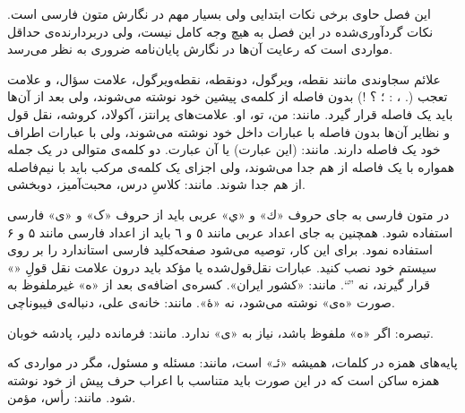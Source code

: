


این فصل حاوی برخی نکات ابتدایی ولی بسیار مهم در نگارش متون فارسی است. 
نکات گردآوری‌شده در این فصل به‌ هیچ‌ وجه کامل نیست، 
ولی دربردارنده‌ی حداقل مواردی است که رعایت آن‌ها در نگارش پایان‌نامه ضروری به نظر می‌رسد.



علائم سجاوندی مانند نقطه، ویرگول، دونقطه، نقطه‌ویرگول، علامت سؤال، و علامت تعجب (. ، : ؛ ؟ !) بدون فاصله از کلمه‌ی پیشین خود نوشته می‌شوند، ولی بعد از آن‌ها باید یک فاصله‌ قرار گیرد. مانند: من، تو، او.
علامت‌های پرانتز، آکولاد، کروشه، نقل قول و نظایر آن‌ها بدون فاصله با عبارات داخل خود نوشته می‌شوند، ولی با عبارات اطراف خود یک فاصله دارند. مانند: (این عبارت) یا {آن عبارت}.
دو کلمه‌ی متوالی در یک جمله همواره با یک فاصله از هم جدا می‌شوند، ولی اجزای یک کلمه‌ی مرکب باید با نیم‌فاصله‌‌
 از هم جدا شوند. مانند: کلاسِ درس، محبت‌آمیز، دوبخشی.




در متون فارسی به جای حروف «ك» و «ي» عربی باید از حروف «ک» و «ی» فارسی استفاده شود. همچنین به جای اعداد عربی مانند ٥ و ٦ باید از اعداد فارسی مانند ۵ و ۶ استفاده نمود. 
برای این کار، توصیه می‌شود صفحه‌کلید‌ فارسی استاندارد را بر روی سیستم خود نصب کنید.
عبارات نقل‌قول‌شده یا مؤکد باید درون علامت نقل قولِ «» قرار گیرند، نه ''``. مانند: «کشور ایران».
کسره‌ی اضافه‌ی بعد از «ه» غیرملفوظ به صورت «ه‌ی» نوشته می‌شود، نه «هٔ». مانند: خانه‌ی علی، دنباله‌ی فیبوناچی.

        تبصره‌: اگر «ه» ملفوظ باشد، نیاز به «‌ی» ندارد. مانند: فرمانده دلیر، پادشه خوبان. 

پایه‌های همزه در کلمات، همیشه «ئـ» است، مانند: مسئله و مسئول، مگر در مواردی که همزه ساکن است که در این ‌صورت باید متناسب با اعراب حرف پیش از خود نوشته شود. مانند: رأس، مؤمن. 




